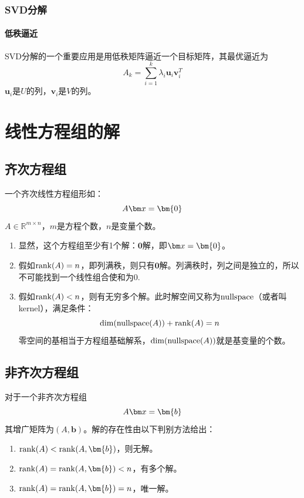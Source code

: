 \subsubsection{SVD分解}
\paragraph*{低秩逼近}SVD分解的一个重要应用是用低秩矩阵逼近一个目标矩阵，其最优逼近为
$$A_k=\sum_{i=1}^k\lambda_i \bm{u}_i\bm{v}_i^T$$
$\bm{u}_i$是$U$的列，$\bm{v}_i$是$V$的列。
\section{线性方程组的解}
\subsection{齐次方程组}
一个齐次线性方程组形如：
$$A\bx=\bm{0}$$
$A\in \mathbb{R}^{m\times n}$，$m$是方程个数，$n$是变量个数。
\begin{enumerate}
\item 显然，这个方程组至少有1个解：$\bm{0}$解，即$\bx=\bm{0}$。
\item 假如$\operatorname{rank}(A)=n$，即列满秩，则只有$\bm{0}$解。列满秩时，列之间是独立的，所以不可能找到一个线性组合使和为0.
\item 假如$\operatorname{rank}(A)<n$，则有无穷多个解。此时解空间又称为$\operatorname{nullspace}$（或者叫kernel），满足条件：
$$\dim(\operatorname{nullspace}(A))+\operatorname{rank}(A)=n$$
零空间的基相当于方程组基础解系，$\dim(\operatorname{nullspace}(A))$就是基变量的个数。
\end{enumerate}
\subsection{非齐次方程组}
对于一个非齐次方程组
$$A\bx=\bm{b}$$
其增广矩阵为$(A,\bm{b})$。解的存在性由以下判别方法给出：
\begin{enumerate}
\item $\rank(A)< \rank(A,\bm{b})$，则无解。
\item $\rank(A)= \rank(A,\bm{b})<n$，有多个解。
\item $\rank(A)= \rank(A,\bm{b})=n$，唯一解。
\end{enumerate}